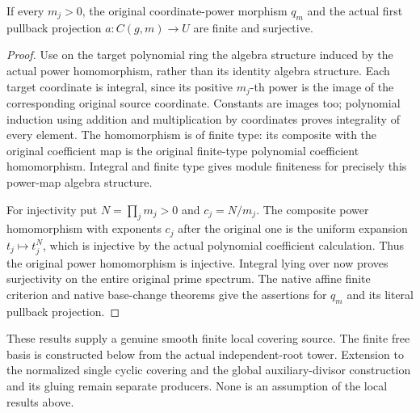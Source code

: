 \begin{lemma}
\label{lem:kn-nadel-kummer-finite-surjective}
\leanok
{}
If every $m_j>0$, the original coordinate-power morphism $q_m$ and
the actual first pullback projection $a:C(g,m)\to U$ are finite and
surjective.
\end{lemma}
\begin{proof}
Use on the target polynomial ring the algebra structure induced by
the actual power homomorphism, rather than its identity algebra
structure.  Each target coordinate is integral, since its positive
$m_j$-th power is the image of the corresponding original source
coordinate.  Constants are images too; polynomial induction using
addition and multiplication by coordinates proves integrality of
every element.  The homomorphism is of finite type: its composite
with the original coefficient map is the original finite-type
polynomial coefficient homomorphism.  Integral and finite type gives
module finiteness for precisely this power-map algebra structure.

For injectivity put $N=\prod_jm_j>0$ and $c_j=N/m_j$.
The composite power homomorphism with exponents $c_j$ after the
original one is the uniform expansion $t_j\mapsto t_j^N$, which is
injective by the actual polynomial coefficient calculation.  Thus
the original power homomorphism is injective.  Integral lying over
now proves surjectivity on the entire original prime spectrum.
The native affine finite criterion and native base-change theorems
give the assertions for $q_m$ and its literal pullback projection.
\end{proof}

These results supply a genuine smooth finite local covering source.
The finite free basis is constructed below from the actual
independent-root tower.  Extension to the normalized single cyclic
covering and the global auxiliary-divisor construction and its
gluing remain separate producers.  None is an assumption of the
local results above.

